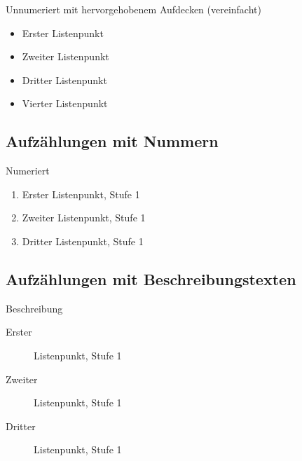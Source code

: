 	\begin{frame}{Unnumeriert mit hervorgehobenem Aufdecken (vereinfacht)}
		\begin{itemize}[<+-| alert@+>]
			\item Erster Listenpunkt
			\item Zweiter Listenpunkt
			\item Dritter Listenpunkt
			\item Vierter Listenpunkt
		\end{itemize}
	\end{frame}


	\subsection{Aufzählungen mit Nummern}

	\begin{frame}{Numeriert}
		\begin{enumerate}
			\item Erster Listenpunkt, Stufe 1
			\item Zweiter Listenpunkt, Stufe 1
			\item Dritter Listenpunkt, Stufe 1
		\end{enumerate}
	\end{frame}


	\subsection{Aufzählungen mit Beschreibungstexten}

	\begin{frame}{Beschreibung}
		\begin{description}
			\item[Erster] Listenpunkt, Stufe 1
			\item[Zweiter] Listenpunkt, Stufe 1
			\item[Dritter] Listenpunkt, Stufe 1
		\end{description}
	\end{frame}


